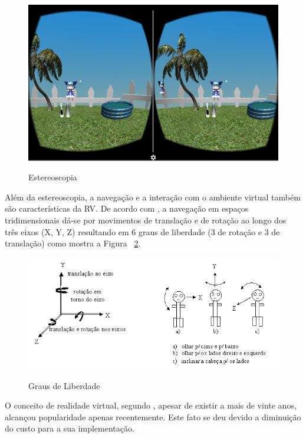 \begin{figure}[H]
	\caption{\small Estereoscopia}
	\centering
	\includegraphics[scale=0.7]{Imagens/estereoscopia.png}
	\label{f.estereoscopia}
\end{figure}

Além da estereoscopia, a navegação e a interação com o ambiente virtual também são características da RV. De acordo com , a navegação em espaços tridimensionais dá-se por movimentos de translação e de rotação ao longo dos três eixos (X, Y, Z) resultando em 6 graus de liberdade (3 de rotação e 3 de translação) como mostra a Figura ~\ref{f.grausliberdade}. 

\begin{figure}[ht]
	\caption{\small Graus de Liberdade}
	\centering
	\includegraphics[scale=1.0]{Imagens/grausliberdade.png}
	\label{f.grausliberdade}
\end{figure}

O conceito de realidade virtual, segundo , apesar de existir a mais de vinte anos, alcançou popularidade apenas recentemente. Este fato se deu devido a diminuição do custo para a sua implementação.

